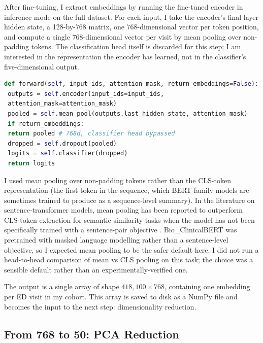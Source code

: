 After fine-tuning, I extract embeddings by running the fine-tuned encoder in inference mode on the full dataset. For each input, I take the encoder's final-layer hidden state, a 128-by-768 matrix, one 768-dimensional vector per token position, and compute a single 768-dimensional vector per visit by mean pooling over non-padding tokens. The classification head itself is discarded for this step; I am interested in the representation the encoder has learned, not in the classifier's five-dimensional output.

\begin{lstlisting}[language=Python, caption={The pooling and embedding extraction step. The classifier head is bypassed via \texttt{return\_embeddings=True}; only the mean-pooled encoder output is returned. Padding tokens are excluded from the mean via the attention mask.}]
def forward(self, input_ids, attention_mask, return_embeddings=False):
 outputs = self.encoder(input_ids=input_ids,
 attention_mask=attention_mask)
 pooled = self.mean_pool(outputs.last_hidden_state, attention_mask)
 if return_embeddings:
 return pooled # 768d, classifier head bypassed
 dropped = self.dropout(pooled)
 logits = self.classifier(dropped)
 return logits
\end{lstlisting}

I used mean pooling over non-padding tokens rather than the CLS-token representation (the first token in the sequence, which BERT-family models are sometimes trained to produce as a sequence-level summary). In the literature on sentence-transformer models, mean pooling has been reported to outperform CLS-token extraction for semantic similarity tasks when the model has not been specifically trained with a sentence-pair objective \citep{reimers2019sentence}. Bio\_ClinicalBERT was pretrained with masked language modelling rather than a sentence-level objective, so I expected mean pooling to be the safer default here. I did not run a head-to-head comparison of mean vs CLS pooling on this task; the choice was a sensible default rather than an experimentally-verified one.

The output is a single array of shape $418{,}100 \times 768$, containing one embedding per ED visit in my cohort. This array is saved to disk as a NumPy file and becomes the input to the next step: dimensionality reduction.

\subsection*{From 768 to 50: PCA Reduction}

